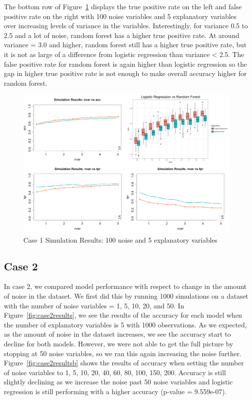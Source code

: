 \documentclass{llncs}
\begin{document}
\noindent 
The bottom row of Figure~\ref{fig:case1resultsb} displays the true positive rate on the left and false positive rate on the right with 100 noise variables and 5 explanatory variables over increasing levels of variance in the variables. Interestingly, for variance 0.5 to 2.5 and a lot of noise, random forest has a higher true positive rate.  At around variance = 3.0 and higher, random forest still has a higher true positive rate, but it is not as large of a difference from logistic regression than variance < 2.5. The false positive rate for random forest is again higher than logistic regression so the gap in higher true positive rate is not enough to make overall accuracy higher for random forest.

\begin{figure}
\centering
\includegraphics[scale=0.55]{case1_b.png}
\caption{Case 1 Simulation Results: 100 noise and 5 explanatory variables}
\label{fig:case1resultsb}
\end{figure}

\subsection{Case 2}
\noindent 
In case 2, we compared model performance with respect to change in the amount of noise in the dataset. We first did this by running 1000 simulations on a dataset with the number of noise variables = 1, 5, 10, 20, and 50.  In Figure~\ref{fig:case2results}, we see the results of the accuracy for each model when the number of explanatory variables is 5 with 1000 observations.  As we expected, as the amount of noise in the dataset increases, we see the accuracy start to decline for both models. However, we were not able to get the full picture by stopping at 50 noise variables, so we ran this again increasing the noise further.  Figure~\ref{fig:case2resultsb} shows the results of accuracy when setting the number of noise variables to 1, 5, 10, 20, 40, 60, 80, 100, 150, 200.  Accuracy is still slightly declining as we increase the noise past 50 noise variables and logistic regression is still performing with a higher accuracy (p-value = 9.559e-07).
\end{document}
